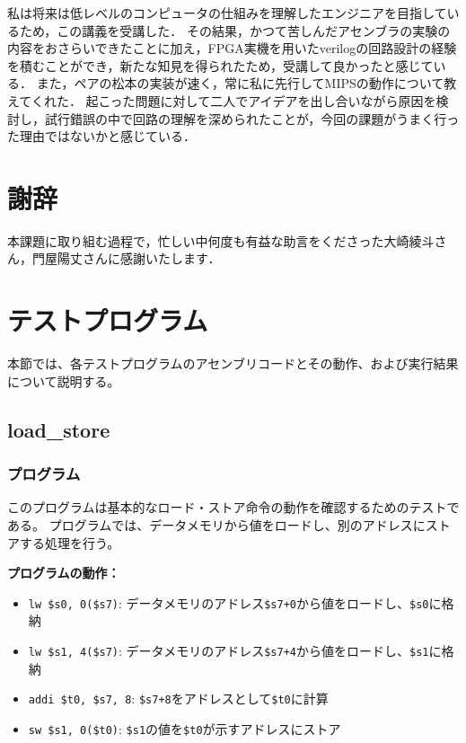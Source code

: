 \documentclass[dvipdfmx]{jsarticle}
\begin{document}
私は将来は低レベルのコンピュータの仕組みを理解したエンジニアを目指しているため，この講義を受講した．
その結果，かつて苦しんだアセンブラの実験の内容をおさらいできたことに加え，FPGA実機を用いたverilogの回路設計の経験を積むことができ，新たな知見を得られたため，受講して良かったと感じている．
また，ペアの松本の実装が速く，常に私に先行してMIPSの動作について教えてくれた．
起こった問題に対して二人でアイデアを出し合いながら原因を検討し，試行錯誤の中で回路の理解を深められたことが，今回の課題がうまく行った理由ではないかと感じている．

\section*{謝辞}
本課題に取り組む過程で，忙しい中何度も有益な助言をくださった大崎綾斗さん，門屋陽丈さんに感謝いたします．

\appendix
\section{テストプログラム}

本節では、各テストプログラムのアセンブリコードとその動作、および実行結果について説明する。

\subsection{load\_store}
\label{appendix:load_store}

\subsubsection{プログラム}
このプログラムは基本的なロード・ストア命令の動作を確認するためのテストである。
プログラムでは、データメモリから値をロードし、別のアドレスにストアする処理を行う。



\textbf{プログラムの動作：}
\begin{itemize}
\item \texttt{lw \$s0, 0(\$s7)}: データメモリのアドレス\texttt{\$s7+0}から値をロードし、\texttt{\$s0}に格納
\item \texttt{lw \$s1, 4(\$s7)}: データメモリのアドレス\texttt{\$s7+4}から値をロードし、\texttt{\$s1}に格納  
\item \texttt{addi \$t0, \$s7, 8}: \texttt{\$s7+8}をアドレスとして\texttt{\$t0}に計算
\item \texttt{sw \$s1, 0(\$t0)}: \texttt{\$s1}の値を\texttt{\$t0}が示すアドレスにストア
\end{itemize}
\end{document}
